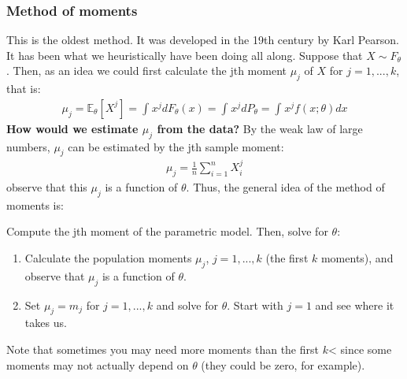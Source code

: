 \documentclass[11pt]{scrartcl}
\theoremstyle{definition}
\theoremstyle{remark}
\newcommand{\EXth}[1]{\mathbb{E}_\theta \left[ #1 \right]}
\newcommand{\idx}[2]{\int_{#1}^{#2}}
\begin{document}
\subsubsection{Method of moments}
	This is the oldest method. It was developed in the 19th century by Karl Pearson. It has been what we heuristically have been doing all along. Suppose that $X \sim F_\theta$. Then, as an idea we could first calculate the jth moment $\mu_j$ of $X$ for $j=1,..., k$, that is: 
	\begin{align*}
			\mu_j = \EXth{X^j} = \idx{}{} x^j dF_\theta (x) = \idx{}{} x^j dP_\theta = \idx{}{} x^j f(x; \theta) dx  
	\end{align*}
	\textbf{How would we estimate $\mu_j$ from the data?} By the weak law of large numbers, $\mu_j$ can be estimated by the jth sample moment: 
	\begin{align*}
		\mu_j = \frac{1}{n} \sum_{i=1}^n X_i^j 	
	\end{align*}
	observe that this $\mu_j$ is a function of $\theta$. Thus, the general idea of the method of moments is: 
	\begin{center}
		Compute the jth moment of the parametric model. Then, solve for $\theta$: 
		\begin{enumerate}[noitemsep]
			\item Calculate the population moments $\mu_j$, $j=1,..., k$ (the first $k$ moments), and observe that $\mu_j$ is a function of $\theta$. 
			\item Set $\mu_j = m_j$ for $j=1,..., k$ and solve for $\theta$. Start with $j=1$ and see where it takes us. 
		\end{enumerate}
	\end{center}
	Note that sometimes you may need more moments than the first $k$< since some moments may not actually depend on $\theta$ (they could be zero, for example). 
	
\end{document}

